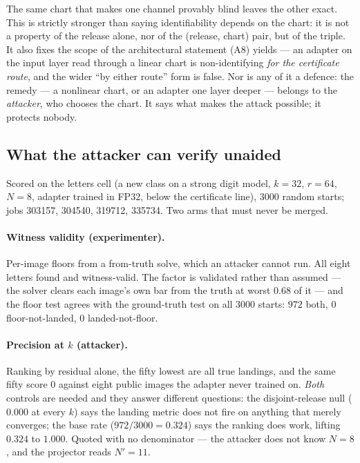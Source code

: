\begin{remark}
The same chart that makes one channel provably blind leaves the other exact.
This is strictly stronger than saying identifiability depends on the chart: it
is not a property of the release alone, nor of the (release, chart) pair, but of
the triple. It also fixes the scope of the architectural statement (A8) yields
--- an adapter on the input layer read through a linear chart is non-identifying
\emph{for the certificate route}, and the wider ``by either route'' form is
false. Nor is any of it a defence: the remedy --- a nonlinear chart, or an
adapter one layer deeper --- belongs to the \emph{attacker}, who chooses the
chart. It says what makes the attack possible; it protects nobody.
\end{remark}

\subsection{What the attacker can verify unaided}
\label{sec:attacker-arm}

Scored on the letters cell (a new class on a strong digit model, $k=32$, $r=64$,
$N=8$, adapter trained in FP32, below the certificate line), $3000$ random
starts; jobs 303157, 304540, 319712, 335734. Two arms that must never be merged.

\paragraph{Witness validity (experimenter).} Per-image floors from a from-truth
solve, which an attacker cannot run. All eight letters found and witness-valid.
The factor is validated rather than assumed --- the solver clears each image's
own bar from the truth at worst $0.68$ of it --- and the floor test agrees with
the ground-truth test on all $3000$ starts: $972$ both, $0$ floor-not-landed,
$0$ landed-not-floor.

\paragraph{Precision at $k$ (attacker).} Ranking by residual alone, the fifty
lowest are all true landings, and the same fifty score $0$ against eight public
images the adapter never trained on. \emph{Both} controls are needed and they
answer different questions: the disjoint-release null ($0.000$ at every $k$)
says the landing metric does not fire on anything that merely converges; the
base rate ($972/3000=0.324$) says the ranking does work, lifting $0.324$ to
$1.000$. Quoted with no denominator --- the attacker does not know $N=8$, and
the projector reads $N'=11$.

